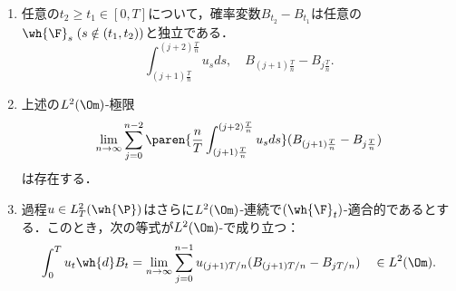 \documentclass[uplatex,dvipdfmx]{jsreport}
\begin{document}
\begin{lemma}[後退Riemann和の極限としての特徴付け]\mbox{}
    \begin{enumerate}
        \item 任意の$t_2\ge t_1\in[0,T]$について，確率変数$B_{t_2}-B_{t_1}$は任意の$\wh{\F}_s\;(s\notin (t_1,t_2))$と独立である．
        \[\int^{(j+2)\frac{T}{n}}_{(j+1)\frac{T}{n}}u_sds,\quad B_{(j+1)\frac{T}{n}}-B_{j\frac{T}{n}}.\]
        \item 上述の$L^2(\Om)$-極限
        \[\lim_{n\to\infty}\sum_{j=0}^{n-2}\paren{\frac{n}{T}\int^{(j+2)\frac{T}{n}}_{(j+1)\frac{T}{n}}u_sds}(B_{(j+1)\frac{T}{n}}-B_{j\frac{T}{n}})\]
        は存在する．
        \item 過程$u\in L^2_T(\wh{\P})$はさらに$L^2(\Om)$-連続で$(\wh{\F}_t)$-適合的であるとする．このとき，次の等式が$L^2(\Om)$-で成り立つ：
        \[\int^T_0u_t\wh{d}B_t=\lim_{n\to\infty}\sum^{n-1}_{j=0}u_{(j+1)T/n}(B_{(j+1)T/n}-B_{jT/n})\quad\in L^2(\Om).\]
    \end{enumerate}
\end{lemma}
\end{document}
